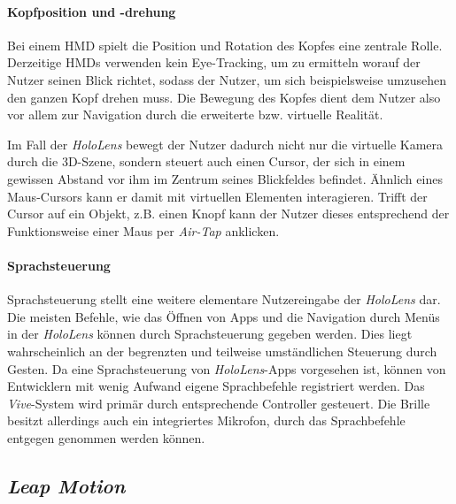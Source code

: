 \paragraph{Kopfposition und -drehung}

Bei einem HMD spielt die Position und Rotation des Kopfes eine zentrale Rolle. 
Derzeitige HMDs verwenden kein Eye-Tracking, um zu ermitteln worauf der Nutzer seinen Blick richtet, sodass der Nutzer, um sich beispielsweise umzusehen den ganzen Kopf drehen muss. Die Bewegung des Kopfes dient dem Nutzer also vor allem zur Navigation durch die erweiterte bzw. virtuelle Realität. 

Im Fall der \textit{HoloLens} bewegt der Nutzer dadurch nicht nur die virtuelle Kamera durch die 3D-Szene, sondern steuert auch einen Cursor, der sich in einem gewissen Abstand vor ihm im Zentrum seines Blickfeldes befindet. Ähnlich eines Maus-Cursors kann er damit mit virtuellen Elementen interagieren. Trifft der Cursor auf ein Objekt, z.B. einen Knopf kann der Nutzer dieses entsprechend der Funktionsweise einer Maus per \textit{Air-Tap} anklicken. 

\paragraph{Sprachsteuerung}

Sprachsteuerung stellt eine weitere elementare Nutzereingabe der \textit{HoloLens} dar. 
Die meisten Befehle, wie das Öffnen von Apps und die Navigation durch Menüs in der \textit{HoloLens} können durch Sprachsteuerung gegeben werden. 
Dies liegt wahrscheinlich an der begrenzten und teilweise umständlichen Steuerung durch Gesten. Da eine Sprachsteuerung von \textit{HoloLens}-Apps vorgesehen ist, können von Entwicklern mit wenig Aufwand eigene Sprachbefehle registriert werden.
Das \textit{Vive}-System wird primär durch entsprechende Controller gesteuert. Die Brille besitzt allerdings auch ein integriertes Mikrofon, durch das Sprachbefehle entgegen genommen werden können.


\subsection{\textit{Leap Motion}}


